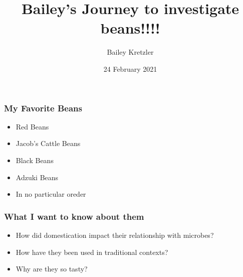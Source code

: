 \documentclass[12pt]{beamer}\usepackage[]{graphicx}\usepackage[]{color}
\title[Learning about Legumes]{Bailey's Journey to investigate beans!!!!} %
\author{Bailey Kretzler} %
\institute[UVM] %
{
University of Vermont \\ %
Department of Plant and Soil Science \\
Burlington, VT 05401 USA \\ 
\medskip
\textit{bkretzle@uvm.edu} %
}
\date{24 February 2021} %
\begin{document}
\begin{frame}
\titlepage %
\end{frame}





\begin{frame}
\frametitle{My Favorite Beans}
\begin{itemize}
\item Red Beans
\item Jacob's Cattle Beans
\item Black Beans
\item Adzuki Beans
\item In no particular oreder
\end{itemize}
\end{frame}

\begin{frame}
\frametitle{What I want to know about them}
\begin{itemize}
\item<1-> How did domestication impact their relationship with microbes?
\item<2-> How have they been used in traditional contexts?
\item<3-> Why are they so tasty?
\end{itemize}
\end{frame}
\end{document}
